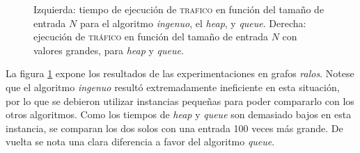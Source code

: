 \begin{figure}[!htbp]
    \caption{Izquierda: tiempo de ejecución de \textsc{trafico} en función del tamaño de entrada $N$ para el algoritmo \textit{ingenuo}, el \textit{heap}, y \textit{queue}. Derecha: ejecución de \textsc{tráfico} en función del tamaño de entrada $N$ con valores grandes, para \textit{heap} y \textit{queue}.}
    \label{grafico_2}
\end{figure}

La figura \ref{grafico_2} expone los resultados de las experimentaciones en grafos \textit{ralos}. Notese que el algoritmo \textit{ingenuo} resultó extremadamente ineficiente en esta situación, por lo que se debieron utilizar instancias pequeñas para poder compararlo con los otros algoritmos. Como los tiempos de \textit{heap} y \textit{queue} son demasiado bajos en esta instancia, se comparan los dos solos con una entrada 100 veces más grande. De vuelta se nota una clara diferencia a favor del algoritmo \textit{queue}.